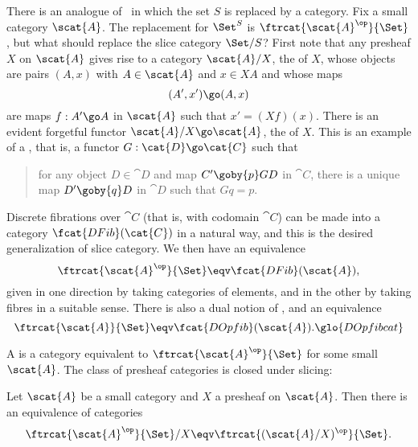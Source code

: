 There is an analogue of~ in which the set $S$ is
replaced by a category.  Fix a small category $\scat{A}$.  The replacement
for $\Set^S$ is $\ftrcat{\scat{A}^\op}{\Set}$, but what should replace the
slice category $\Set/S$?  First note that any presheaf $X$ on $\scat{A}$
gives rise to a category $\scat{A}/X$,%
% 
%
the %
% 
% 
of $X$, whose objects are pairs $(A, x)$ with $A \in \scat{A}$
and $x \in XA$ and whose maps
\[
(A', x') \go (A, x)
\]
are maps $f: A' \go A$ in $\scat{A}$ such that $x' = (Xf)(x)$.  There is an
evident forgetful functor $\scat{A}/X \go \scat{A}$,
the %
%
%
of $X$.  This is an example of a
,%
%
%
that is, a functor $G: \cat{D} \go \cat{C}$
such that
%
\begin{quote}
  for any object $D \in \cat{D}$ and map $C' \goby{p} GD$ in $\cat{C}$,
  there is a unique map $D' \goby{q} D$ in $\cat{D}$ such that $Gq = p$. 
\end{quote}
%
Discrete fibrations over $\cat{C}$ (that is, with codomain $\cat{C}$) can
be made into a category $\fcat{DFib}(\cat{C})$%
% 
%
in a natural way, and this
is the desired generalization of slice category.  We then have an
equivalence
\[
\ftrcat{\scat{A}^\op}{\Set}
\eqv
\fcat{DFib}(\scat{A}),
\]
given in one direction by taking categories of elements, and in the other
by taking fibres in a suitable sense.  There is also a dual notion of
,%
%
%
and an equivalence
\[
\ftrcat{\scat{A}}{\Set}
\eqv
\fcat{DOpfib}(\scat{A}).%
% 
\glo{DOpfibcat}
%
\]

A  is a category equivalent to
$\ftrcat{\scat{A}^\op}{\Set}$ for some small $\scat{A}$.  The class of
presheaf categories is closed under slicing:
%
\begin{propn}	
Let $\scat{A}$ be a small category and $X$ a presheaf on $\scat{A}$.  Then
there is an equivalence of categories
\[
\ftrcat{\scat{A}^\op}{\Set} / X
\eqv
\ftrcat{(\scat{A}/X)^\op}{\Set}.
\]
\ \done
\end{propn}%
%
%

